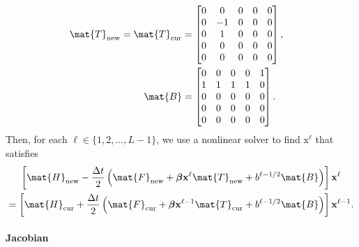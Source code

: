 \documentclass{jpmarticle}
\renewcommand{\vec}[1]{\boldsymbol{\mathrm{#1}}}
\let\subequationsorig\subequations%
\let\endsubequationsorig\endsubequations%
\renewenvironment{subequations}{
  \subequationsorig
  \renewcommand{\theequation}{\theparentequation.\arabic{equation}}
}{
  \endsubequationsorig
}
\begin{document}
\begin{subequations}
\begin{align}
    \\
    \mat{T}_{\mathrm{new}} =
    \mat{T}_{\mathrm{cur}} &=
    \begin{bmatrix}
      0 & 0 & 0 & 0 & 0 \\
      0 & -1 & 0 & 0 & 0 \\
      0 & 1 & 0 & 0 & 0 \\
      0 & 0 & 0 & 0 & 0 \\
      0 & 0 & 0 & 0 & 0
    \end{bmatrix},
    \\
    \mat{B} &=
    \begin{bmatrix}
      0 & 0 & 0 & 0 & 1 \\
      1 & 1 & 1 & 1 & 0 \\
      0 & 0 & 0 & 0 & 0 \\
      0 & 0 & 0 & 0 & 0 \\
      0 & 0 & 0 & 0 & 0
    \end{bmatrix}.
  \end{align}
  Then, for each $\ell \in \{1, 2, \ldots, L - 1\}$,
  we use a nonlinear solver to find $\vec{x}^{\ell}$ that satisfies
  \begin{multline}
    \label{step_unstructured}
    \left[
      \mat{H}_{\mathrm{new}}
      - \frac{\Delta t}{2}
      \left(
        \mat{F}_{\mathrm{new}}
        + \vec{\beta} \vec{x}^{\ell} \mat{T}_{\mathrm{new}}
        + b^{\ell - 1 / 2} \mat{B}
      \right)
    \right]
    \vec{x}^{\ell}
    \\
    =
    \left[
      \mat{H}_{\mathrm{cur}}
      + \frac{\Delta t}{2}
      \left(
        \mat{F}_{\mathrm{cur}}
        + \vec{\beta} \vec{x}^{\ell - 1} \mat{T}_{\mathrm{cur}}
        + b^{\ell - 1 / 2} \mat{B}
      \right)
    \right]
    \vec{x}^{\ell - 1}.
  \end{multline}
\end{subequations}


\paragraph{Jacobian}
\end{document}
